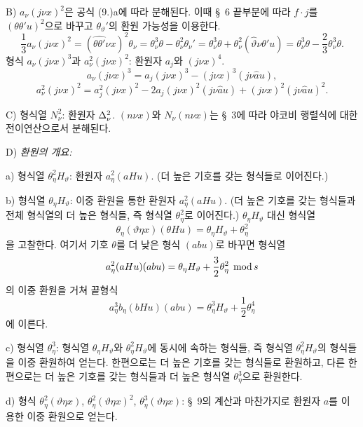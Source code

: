 \noindent B) $a_\nu(j\nu x)^2$은 공식 (9.)a에 따라 분해된다. 이때 \S\ 6 끝부분에 따라 $f\cdot j$를 $(\theta\theta'u)^2$으로 바꾸고 $\theta_\vartheta'$의 환원 가능성을 이용한다.
\[
\frac13a_\nu(j\nu x)^2=(\widehat{\theta\theta'}\nu x)^2\theta_\nu
=\theta_\nu^3\theta-\theta_\nu^2\theta_\nu'
=\theta_\nu^3\theta+\theta_\nu^2(\widehat{\vartheta}\nu\theta'u)
=\theta_\nu^3\theta-\frac23\theta_\nu^3\theta.
\]
형식 $a_\nu(j\nu x)^3$과 $a_\nu^2(j\nu x)^2$: 환원자 $a_j$와 $(j\nu x)^4$.
\[
a_\nu(j\nu x)^3=a_j(j\nu x)^3-(j\nu x)^3(j\nu\widehat{a}u),
\]
\[
a_\nu^2(j\nu x)^2=a_j^2(j\nu x)^2-2a_j(j\nu x)^2(j\nu\widehat{a}u)+(j\nu x)^2(j\nu\widehat{a}u)^2.
\]

\noindent C) 형식열 $N_\nu^2$: 환원자 $\Delta_\nu^2$.
$(n\nu x)$와 $N_\nu(n\nu x)$는 \S\ 3에 따라 야코비 행렬식에 대한 전이연산으로서 분해된다.

\noindent D) \emph{환원의 개요:}

a) 형식열 $\theta_\eta^2H_\vartheta$: 환원자 $a_\eta^2(aHu)$. (더 높은 기호를 갖는 형식들로 이어진다.)

b) 형식열 $\theta_\eta H_\vartheta$: 이중 환원을 통한 환원자 $a_\eta^2(aHu)$.
(더 높은 기호를 갖는 형식들과 전체 형식열의 더 높은 형식들, 즉 형식열 $\theta_\eta^2$로 이어진다.) $\theta_\eta H_\vartheta$ 대신 형식열
\[
\theta_\eta(\vartheta\eta x)(\theta Hu)=\theta_\eta H_\vartheta+\theta_\eta^2
\]
을 고찰한다. 여기서 기호 $\theta$를 더 낮은 형식 $(abu)$로 바꾸면 형식열
\[
a_\eta^2(aHu)(abu)=\theta_\eta H_\vartheta+\frac32\theta_\eta^2\;\operatorname{mod} s
\]
의 이중 환원을 거쳐 끝형식
\[
a_\eta^3b_\eta(bHu)(abu)=\theta_\eta^3H_\vartheta+\frac12\theta_\eta^4
\]
에 이른다.

c) 형식열 $\theta_\eta^3$: 형식열 $\theta_\eta H_\vartheta$와 $\theta_\eta^2H_\vartheta$에 동시에 속하는 형식들, 즉 형식열 $\theta_\eta^2H_\vartheta$의 형식들을 이중 환원하여 얻는다. 한편으로는 더 높은 기호를 갖는 형식들로 환원하고, 다른 한편으로는 더 높은 기호를 갖는 형식들과 더 높은 형식열 $\theta_\eta^3$으로 환원한다.

d) 형식 $\theta_\eta^2(\vartheta\eta x)$, $\theta_\eta^2(\vartheta\eta x)^2$, $\theta_\eta^3(\vartheta\eta x)$: \S\ 9의 계산과 마찬가지로 환원자 $a$를 이용한 이중 환원으로 얻는다.

